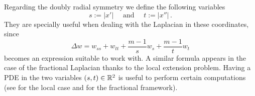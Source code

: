 Regarding the doubly radial symmetry we define the following variables
$$
s := |x'| \quad \text{ and } \quad t:=|x''|\,.
$$
They are specially useful when dealing with the Laplacian in these coordinates, since
\begin{equation}
\label{Eq:Laplacian-st}
\Delta w = w_{ss} + w_{tt} + \frac{m-1}{s}w_s + \frac{m-1}{t}w_t
\end{equation}
becomes an expression suitable to work with. A similar formula appears in the case of the fractional Laplacian thanks to the local extension problem. Having a PDE in the two variables $(s,t)\in \mathbb{R}^2$ is useful to perform certain computations (see \cite{CabreTerraI, CabreTerraII,Cabre-Saddle, CabreRosOton-DoubleRev} for the local case and \cite{Cinti-Saddle, Cinti-Saddle2, Felipe-Sanz-Perela:SaddleFractional} for the fractional framework).

%
 
 
